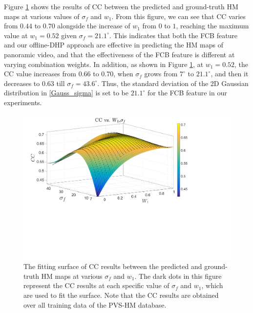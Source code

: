 \documentclass[10pt,journal,compsoc]{IEEEtran}
\begin{document}
Figure \ref{fitting_surface} shows the results of  CC between the predicted and ground-truth HM maps at various values of $\sigma_f$ and $w_1$. From this figure, we can see that CC varies from $0.44$ to $0.70$ alongside the increase of $w_1$ from $0$ to $1$, reaching the maximum value at $w_1=0.52$ given $\sigma_f=21.1^\circ$. This indicates that both the FCB feature and our offline-DHP approach are effective in predicting the HM maps of panoramic video, and that the effectiveness of the FCB feature is different at varying combination weights. In addition, as shown in Figure \ref{fitting_surface}, at $w_1=0.52$, the CC value increases from 0.66 to 0.70, when $\sigma_f$ grows from $7^\circ$ to $21.1^\circ$, and then it decreases to 0.63 till $\sigma_f = 43.6^\circ$. Thus, the standard deviation of the 2D Gaussian distribution in \eqref{Gauss_sigma} is set to be $21.1^\circ$ for the FCB feature in our experiments.


\begin{figure}
\vspace{-1em}
	\begin{center}
		\centerline{\includegraphics[width=.8\columnwidth]{figures/experiment/Fitting}}%
      \vspace{-1em}
		\caption{\footnotesize{The fitting surface of CC results between the predicted and ground-truth HM maps at various $\sigma_f$ and $w_1$. The dark dots in this figure represent the CC results at each specific value of $\sigma_f$ and $w_1$, which are used to fit the surface. Note that the CC results are obtained over all training data of the PVS-HM database.}}
		\label{fitting_surface}
	\end{center}
\vspace{-2em}
\end{figure}
\end{document}
